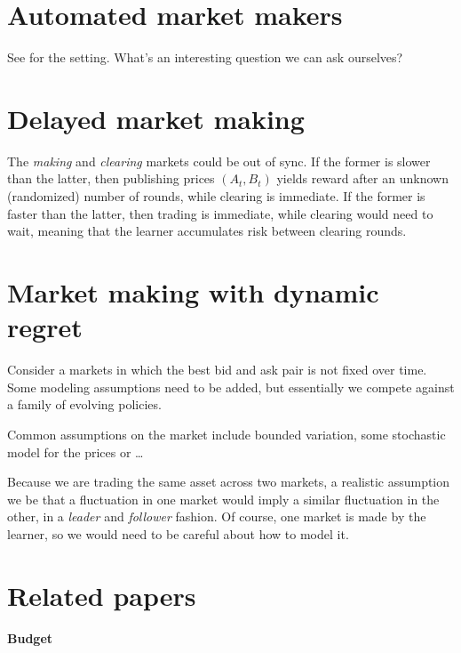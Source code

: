 \documentclass[a4paper,11pt]{article}
\begin{document}
\section{Automated market makers}

See \citep{bar-onUniswapLiquidityProvision2023} for the setting. What's an interesting question we can ask ourselves?

\section{Delayed market making}

The \textit{making} and \textit{clearing} markets could be out of sync. If the former is slower than the latter, then publishing prices $(A_t, B_t)$ yields reward after an unknown (randomized) number of rounds, while clearing is immediate. If the former is faster than the latter, then trading is immediate, while clearing would need to wait, meaning that the learner accumulates risk between clearing rounds.

\section{Market making with dynamic regret}

Consider a markets in which the best bid and ask pair is not fixed over time. Some modeling assumptions need to be added, but essentially we compete against a family of evolving policies. 

Common assumptions on the market include bounded variation, some stochastic model for the prices or \dots

Because we are trading the same asset across two markets, a realistic assumption we be that a fluctuation in one market would imply a similar fluctuation in the other, in a \textit{leader} and \textit{follower} fashion. Of course, one market is made by the learner, so we would need to be careful about how to model it.

\clearpage

\section{Related papers}\label{sec:papers}

\paragraph{Budget}
\end{document}

